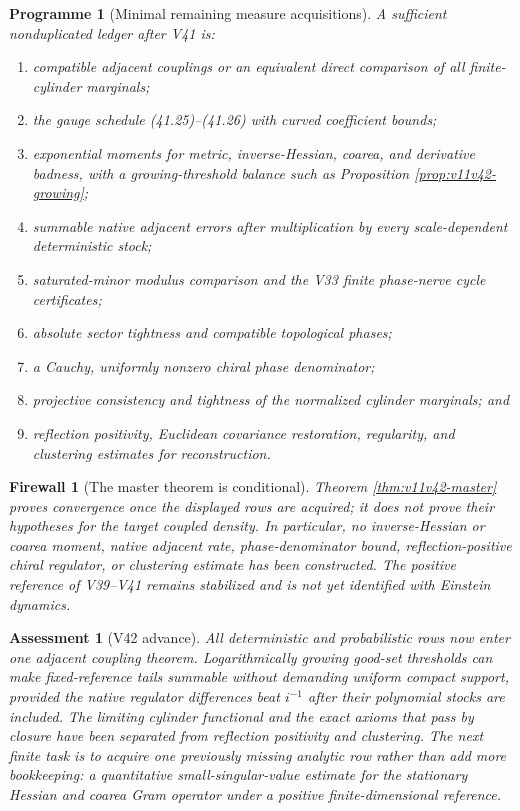 \documentclass[11pt]{article}
\newtheorem{assessment}[theorem]{Assessment}
\newtheorem{firewall}[theorem]{Firewall}
\newtheorem{programme}[theorem]{Programme}
\begin{document}
\begin{programme}[Minimal remaining measure acquisitions]
\label{prog:v11v42-acquisitions}
A sufficient nonduplicated ledger after V41 is:
\begin{enumerate}[label=\textnormal{(M\arabic*)}]
\item compatible adjacent couplings or an equivalent direct comparison
of all finite-cylinder marginals;
\item the gauge schedule (41.25)--(41.26) with curved coefficient
bounds;
\item exponential moments for metric, inverse-Hessian, coarea, and
derivative badness, with a growing-threshold balance such as
Proposition \ref{prop:v11v42-growing};
\item summable native adjacent errors after multiplication by every
scale-dependent deterministic stock;
\item saturated-minor modulus comparison and the V33 finite phase-nerve
cycle certificates;
\item absolute sector tightness and compatible topological phases;
\item a Cauchy, uniformly nonzero chiral phase denominator;
\item projective consistency and tightness of the normalized cylinder
marginals; and
\item reflection positivity, Euclidean covariance restoration,
regularity, and clustering estimates for reconstruction.
\end{enumerate}
\end{programme}

\begin{firewall}[The master theorem is conditional]
\label{fw:v11v42-conditional}
Theorem \ref{thm:v11v42-master} proves convergence once the displayed
rows are acquired; it does not prove their hypotheses for the target
coupled density.  In particular, no inverse-Hessian or coarea moment,
native adjacent rate, phase-denominator bound, reflection-positive
chiral regulator, or clustering estimate has been constructed.
The positive reference of V39--V41 remains stabilized and is not yet
identified with Einstein dynamics.
\end{firewall}

\begin{assessment}[V42 advance]
\label{ass:v11v42}
All deterministic and probabilistic rows now enter one adjacent
coupling theorem.  Logarithmically growing good-set thresholds can make
fixed-reference tails summable without demanding uniform compact
support, provided the native regulator differences beat \(i^{-1}\)
after their polynomial stocks are included.  The limiting cylinder
functional and the exact axioms that pass by closure have been
separated from reflection positivity and clustering.  The next finite
task is to acquire one previously missing analytic row rather than add
more bookkeeping: a quantitative small-singular-value estimate for the
stationary Hessian and coarea Gram operator under a positive
finite-dimensional reference.
\end{assessment}
\end{document}
